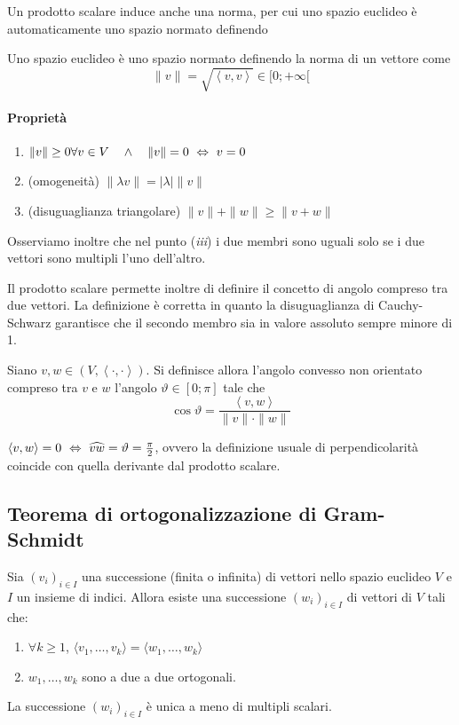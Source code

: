 \documentclass{article}     %
\newcommand{\scp}[1][\cdot,\cdot]{\left\langle #1 \right\rangle}
\begin{document}
Un prodotto scalare induce anche una norma, per cui uno spazio euclideo è automaticamente uno spazio normato definendo

\begin{boxdef}[Norma]
    Uno spazio euclideo è uno spazio normato definendo la norma di un vettore come 
    \[\|v\|=\sqrt{\scp[v,v]}\in [0;+\infty[\]
\end{boxdef}
\paragraph{Proprietà}
\begin{enumerate}[label=\it\roman*)]
    \item $\|v\|\geq 0\forall v \in V \quad \land \quad \|v\|=0\ \Leftrightarrow\ v=0$
    \item (omogeneità) $\|\lambda v\|=|\lambda|\|v\|$
    \item (disuguaglianza triangolare) $\|v\|+\|w\|\geq \|v+w\|$
\end{enumerate}
Osserviamo inoltre che nel punto (\textit{iii}) i due membri sono uguali solo se i due vettori sono multipli l'uno dell'altro.

Il prodotto scalare permette inoltre di definire il concetto di angolo compreso tra due vettori. La definizione è corretta in quanto la disuguaglianza di Cauchy-Schwarz garantisce che il secondo membro sia in valore assoluto sempre minore di 1.
\begin{boxdef}
    Siano $v,w \in (V,\scp)$. Si definisce allora l'angolo convesso non orientato compreso tra $v$ e $w$ l'angolo $\vartheta\in [0;\pi]$ tale che 
    \[\cos \vartheta = \frac{\scp[v,w]}{\|v\|\cdot \|w\|}\]
\end{boxdef}
\begin{oss}
    $\scp[v,w]=0\ \Harr \ \widehat{vw}=\vartheta = \frac{\pi}{2}$, ovvero la definizione usuale di perpendicolarità coincide con quella derivante dal prodotto scalare.
\end{oss}
\subsection{Teorema di ortogonalizzazione di Gram-Schmidt}

\begin{shadedTheorem}
    Sia $(v_i)_{i\in I}$ una successione (finita o infinita) di vettori nello spazio euclideo $V$ e $I$ un insieme di indici. Allora esiste una successione $(w_i)_{i\in I}$ di vettori di $V$ tali che:
    \begin{enumerate}[label=\it\roman*)]
        \item $\forall k\geq 1$, $\langle v_1, \dots, v_k\rangle= \langle w_1, \dots, w_k\rangle$
        \item $w_1, \dots, w_k$ sono a due a due ortogonali.
    \end{enumerate}
    La successione $(w_i)_{i\in I}$ è unica a meno di multipli scalari.
\end{shadedTheorem}
\end{document}
